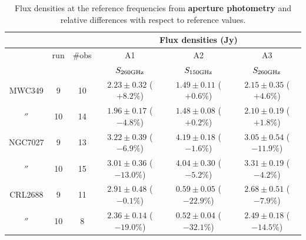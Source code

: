 \begin{table}[th]
\begin{center}
\begin{tabular}{|c|c|c|c|c|c|}
\hline
\multicolumn{3}{|c}{}  & \multicolumn{3}{|c|}{Flux densities (Jy)}   \\
\hline
         & run  & \#obs &  A1                    &  A2                   &    A3                    \\
         &      &      &  $S_{260 {\rm GHz}}$     &  $S_{150 {\rm GHz}}$  & $S_{260 {\rm GHz}}$    \\
\hline\hline
MWC349   &  9   & 10  &  $2.23\pm0.32$  ($+8.2\%$)  &  $1.49\pm0.11$ ($+0.6\%$) &  $2.15\pm0.35$ ($+4.6\%$)      \\
  $''$   & 10   & 14  &  $1.96\pm0.17$  ($-4.8\%$)  &  $1.48\pm0.08$ ($+0.2\%$) &  $2.10\pm0.19$ ($+1.8\%$)                  \\ 
  \hline
NGC7027  &  9   & 13  &  $3.22\pm0.39$  ($-6.9\%$)  &  $4.19\pm0.18$ ($-1.6\%$) & $3.05\pm0.54$  ($-11.9\%$)      \\
  $''$   & 10   & 15  &  $3.01\pm0.36$  ($-13.0\%$) &  $4.04\pm0.30$ ($-5.2\%$) & $3.31\pm0.19$  ($-4.2\%$)                   \\ 
  \hline
CRL2688  &  9   & 11  &  $2.91\pm0.48$  ($-0.1\%$)  &  $0.59\pm0.05$ ($-22.9\%$)  &  $2.68\pm0.51$ ($-7.9\%$)     \\
  $''$   & 10   &  8  &  $2.36\pm0.14$  ($-19.0\%$) &  $0.52\pm0.04$ ($-32.1\%$)  &  $2.49\pm0.18$ ($-14.5\%$)                   \\
\hline
\end{tabular}
\caption{Flux densities at the reference frequencies from {\bf aperture photometry} and relative differences   with respect to reference values.}
\end{center}
\label{tab:flux_sec_Ap}
\end{table}


